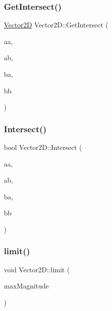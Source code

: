 \hypertarget{class_vector2_d_a61b8609e60892e34d458559ec11d020a}{}\label{class_vector2_d_a61b8609e60892e34d458559ec11d020a} 
\subsubsection{\texorpdfstring{Get\+Intersect()}{GetIntersect()}}
{\footnotesize\ttfamily \hyperlink{class_vector2_d}{Vector2D} Vector2\+D\+::\+Get\+Intersect (\begin{DoxyParamCaption}\item[{const \hyperlink{class_vector2_d}{Vector2D} \&}]{aa,  }\item[{const \hyperlink{class_vector2_d}{Vector2D} \&}]{ab,  }\item[{const \hyperlink{class_vector2_d}{Vector2D} \&}]{ba,  }\item[{const \hyperlink{class_vector2_d}{Vector2D} \&}]{bb }\end{DoxyParamCaption})\hspace{0.3cm}{\ttfamily [static]}}

\hypertarget{class_vector2_d_ae18bd72a2e20265772884cbf7a9bff94}{}\label{class_vector2_d_ae18bd72a2e20265772884cbf7a9bff94} 
\subsubsection{\texorpdfstring{Intersect()}{Intersect()}}
{\footnotesize\ttfamily bool Vector2\+D\+::\+Intersect (\begin{DoxyParamCaption}\item[{const \hyperlink{class_vector2_d}{Vector2D} \&}]{aa,  }\item[{const \hyperlink{class_vector2_d}{Vector2D} \&}]{ab,  }\item[{const \hyperlink{class_vector2_d}{Vector2D} \&}]{ba,  }\item[{const \hyperlink{class_vector2_d}{Vector2D} \&}]{bb }\end{DoxyParamCaption})\hspace{0.3cm}{\ttfamily [static]}}

\hypertarget{class_vector2_d_afa1ae9e0f8f050504007fe93c72c9ae7}{}\label{class_vector2_d_afa1ae9e0f8f050504007fe93c72c9ae7} 
\subsubsection{\texorpdfstring{limit()}{limit()}}
{\footnotesize\ttfamily void Vector2\+D\+::limit (\begin{DoxyParamCaption}\item[{float}]{max\+Magnitude }\end{DoxyParamCaption})}

